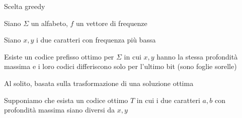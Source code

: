 \begin{frame}{Scelta greedy}

\vspace{-9pt}
\begin{myboxtitle}[Ipotesi]
\BI
\item Siano $\Sigma$ un alfabeto, $f$ un vettore di frequenze
\item Siano $x, y$ i \alert{due caratteri con frequenza più bassa}
\EI
\end{myboxtitle}

\begin{myboxtitle}[Tesi]
\BI
\item Esiste un codice prefisso ottimo per $\Sigma$ in cui $x,y$ hanno la stessa 
profondità massima e i loro codici differiscono solo per l'ultimo bit (sono foglie sorelle)
\EI
\end{myboxtitle}

\begin{myboxtitle}[Dimostrazione]
\BI
\item Al solito, basata sulla trasformazione di una soluzione ottima
\item Supponiamo che esista un codice ottimo $T$ in cui i due caratteri $a,b$ con profondità massima siano diversi da $x,y$
\EI
\end{myboxtitle}

\end{frame}

